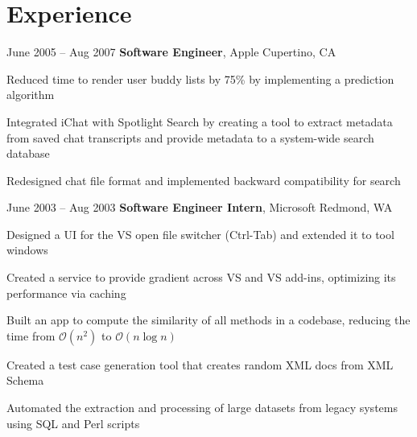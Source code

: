 \documentclass{maxcv}
\begin{document}
\section{Experience}
\begin{twocolentry}{
        June 2005 – Aug 2007
    }
    \textbf{Software Engineer}, Apple \dash{} Cupertino, CA\end{twocolentry}
\vspace{0.10 cm}
\begin{onecolentry}
    \begin{highlights}
        \item Reduced time to render user buddy lists by 75\% by implementing a prediction algorithm
        \item Integrated iChat with Spotlight Search by creating a tool to extract metadata from saved chat transcripts and provide metadata to a system-wide search database
        \item Redesigned chat file format and implemented backward compatibility for search
    \end{highlights}
\end{onecolentry}
\vspace{0.2 cm}
\begin{twocolentry}{
        June 2003 – Aug 2003
    }
    \textbf{Software Engineer Intern}, Microsoft \dash{} Redmond, WA\end{twocolentry}
\vspace{0.10 cm}
\begin{onecolentry}
    \begin{highlights}
        \item Designed a UI for the VS open file switcher (Ctrl-Tab) and extended it to tool windows
        \item Created a service to provide gradient across VS and VS add-ins, optimizing its performance via caching
        \item Built an app to compute the similarity of all methods in a codebase, reducing the time from \(\mathcal{O}(n^2)\) to \(\mathcal{O}(n \log n)\)
        \item Created a test case generation tool that creates random XML docs from XML Schema
        \item Automated the extraction and processing of large datasets from legacy systems using SQL and Perl scripts
    \end{highlights}
\end{onecolentry}
\end{document}
